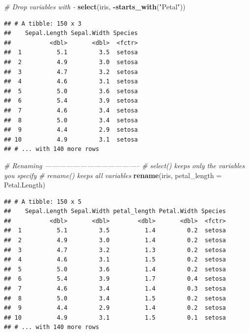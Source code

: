 \documentclass[]{book}
\newenvironment{Shaded}{\begin{snugshade}}{\end{snugshade}}
\newcommand{\KeywordTok}[1]{\textcolor[rgb]{0.13,0.29,0.53}{\textbf{#1}}}
\newcommand{\DataTypeTok}[1]{\textcolor[rgb]{0.13,0.29,0.53}{#1}}
\newcommand{\StringTok}[1]{\textcolor[rgb]{0.31,0.60,0.02}{#1}}
\newcommand{\CommentTok}[1]{\textcolor[rgb]{0.56,0.35,0.01}{\textit{#1}}}
\newcommand{\OperatorTok}[1]{\textcolor[rgb]{0.81,0.36,0.00}{\textbf{#1}}}
\newcommand{\NormalTok}[1]{#1}
\begin{document}
\begin{Shaded}
\begin{Highlighting}[]
\CommentTok{# Drop variables with -}
\KeywordTok{select}\NormalTok{(iris, }\OperatorTok{-}\KeywordTok{starts_with}\NormalTok{(}\StringTok{"Petal"}\NormalTok{))}
\end{Highlighting}
\end{Shaded}

\begin{verbatim}
## # A tibble: 150 x 3
##    Sepal.Length Sepal.Width Species
##           <dbl>       <dbl>  <fctr>
##  1          5.1         3.5  setosa
##  2          4.9         3.0  setosa
##  3          4.7         3.2  setosa
##  4          4.6         3.1  setosa
##  5          5.0         3.6  setosa
##  6          5.4         3.9  setosa
##  7          4.6         3.4  setosa
##  8          5.0         3.4  setosa
##  9          4.4         2.9  setosa
## 10          4.9         3.1  setosa
## # ... with 140 more rows
\end{verbatim}

\begin{Shaded}
\begin{Highlighting}[]
\CommentTok{# Renaming -----------------------------------------}
\CommentTok{# select() keeps only the variables you specify}
\CommentTok{# rename() keeps all variables}
\KeywordTok{rename}\NormalTok{(iris, }\DataTypeTok{petal_length =}\NormalTok{ Petal.Length)}
\end{Highlighting}
\end{Shaded}

\begin{verbatim}
## # A tibble: 150 x 5
##    Sepal.Length Sepal.Width petal_length Petal.Width Species
##           <dbl>       <dbl>        <dbl>       <dbl>  <fctr>
##  1          5.1         3.5          1.4         0.2  setosa
##  2          4.9         3.0          1.4         0.2  setosa
##  3          4.7         3.2          1.3         0.2  setosa
##  4          4.6         3.1          1.5         0.2  setosa
##  5          5.0         3.6          1.4         0.2  setosa
##  6          5.4         3.9          1.7         0.4  setosa
##  7          4.6         3.4          1.4         0.3  setosa
##  8          5.0         3.4          1.5         0.2  setosa
##  9          4.4         2.9          1.4         0.2  setosa
## 10          4.9         3.1          1.5         0.1  setosa
## # ... with 140 more rows
\end{verbatim}
\end{document}
